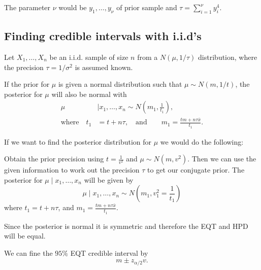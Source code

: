 \documentclass[10pt, a4paper]{article}
\begin{document}
The parameter $\nu$ would be $y_1, \dotsc, y_{\nu}$ of prior sample and $\tau = \sum_{i = 1}^{\nu}y_i ^ 4$.

\subsection{Finding credible intervals with i.i.d's}

Let $X_1, \dotsc, X_n$ be an i.i.d. sample of size $n$ from a $N(\mu, 1 / \tau)$ distribution,
where the precision $\tau = 1 / \sigma ^ 2$ is assumed known.

If the prior for $\mu$ is given a normal distribution such that $\mu \sim N(m, 1 / t)$,
the posterior for $\mu$ will also be normal with
\begin{align*}
    \mu&\mid x_1, \dotsc, x_n \sim N\left(m_1, \frac{1}{t_1}\right), \\
    \text{where}\quad t_1 &= t + n\tau,\quad\text{and}\qquad m_1 = \frac{tm + n\tau\bar{x}}{t_1}.
\end{align*}

If we want to find the posterior distribution for $\mu$ we would do the following:

Obtain the prior precision using $t = \frac{1}{v ^ 2}$ and $\mu \sim N(m, v ^ 2)$.
Then we can use the given information to work out the precision $\tau$ to get our conjugate prior.
The posterior for $\mu\mid x_1, \dotsc, x_n$ will be given by
\[
\mu\mid x_1, \dotsc, x_n \sim N\left(m_1, v_1 ^ 2 = \frac{1}{t_1}\right)
\]
where $t_1 = t + n\tau$,
and $m_1 = \frac{tm + n\tau\bar{x}}{t_1}$.

Since the posterior is normal it is symmetric and therefore the EQT and HPD will be equal.

We can fine the $95\%$ EQT credible interval by
\[
m \pm z_{\alpha / 2}v.
\]
\end{document}
